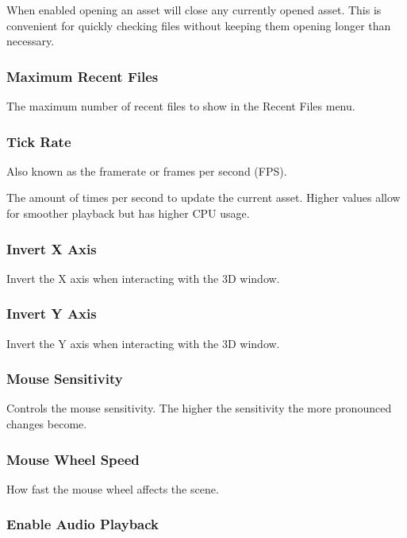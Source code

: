 \documentclass[10pt, a4paper, titlepage, oneside]{article}
\begin{document}
When enabled opening an asset will close any currently opened asset. This is convenient for quickly checking files without keeping them opening longer than necessary.

\subsubsection{Maximum Recent Files}

The maximum number of recent files to show in the Recent Files menu.

\subsubsection{Tick Rate}

Also known as the framerate or frames per second (FPS).

The amount of times per second to update the current asset. Higher values allow for smoother playback but has higher CPU usage.

\newpage

\subsubsection{Invert X Axis}

Invert the X axis when interacting with the 3D window.

\subsubsection{Invert Y Axis}

Invert the Y axis when interacting with the 3D window.

\subsubsection{Mouse Sensitivity}

Controls the mouse sensitivity. The higher the sensitivity the more pronounced changes become.

\subsubsection{Mouse Wheel Speed}

How fast the mouse wheel affects the scene.

\subsubsection{Enable Audio Playback}
\end{document}
